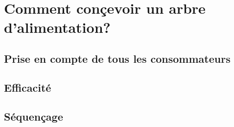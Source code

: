 
\section{Comment conçevoir un arbre d'alimentation?}

\subsection{Prise en compte de tous les consommateurs}
\subsection{Efficacité}
\subsection{Séquençage}